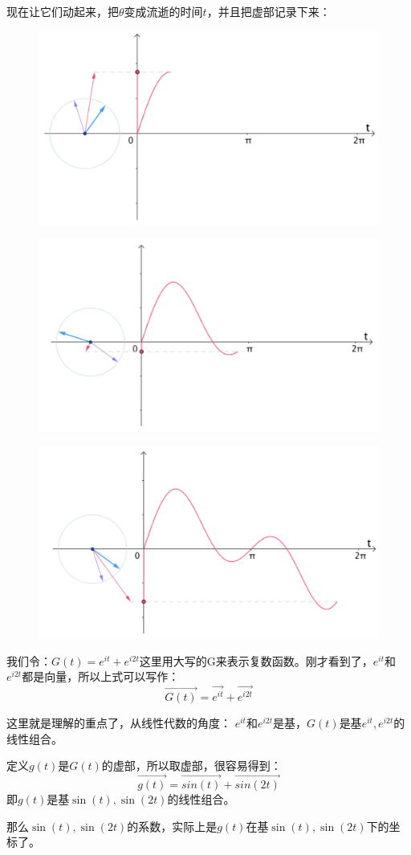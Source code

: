 \documentclass[12pt]{article}
\begin{document}
现在让它们动起来，把$\theta$变成流逝的时间$t$，并且把虚部记录下来：
\begin{figure}[H]
  \centering
  \includegraphics[width=.5\textwidth]{fig/eitheta向量和动态1.png} 
\end{figure}
\begin{figure}[H]
  \centering
  \includegraphics[width=.5\textwidth]{fig/eitheta向量和动态2.png} 
\end{figure}
\begin{figure}[H]
  \centering
  \includegraphics[width=.5\textwidth]{fig/eitheta向量和动态3.png} 
\end{figure}

我们令：$G(t)=e^{it}+e^{i2t}$这里用大写的G来表示复数函数。刚才看到了，$e^{it}$和$e^{i2t}$都是向量，所以上式可以写作：
$$
\overrightarrow{G(t)}=\overrightarrow{e^{it}}+\overrightarrow{e^{i2t}}
$$

这里就是理解的重点了，从线性代数的角度：
$e^{it}$和$e^{i2t}$是基，$G(t)$是基$e^{it},e^{i2t}$的线性组合。

定义$g(t)$是$G(t)$的虚部，所以取虚部，很容易得到：
$$\overrightarrow{g(t)}=\overrightarrow{sin(t)}+\overrightarrow{sin(2t)}$$
即$g(t)$是基$\sin(t),\sin(2t)$的线性组合。

那么$\sin(t),\sin(2t)$的系数，实际上是$g(t)$在基$\sin(t),\sin(2t)$下的坐标了。
\end{document}
